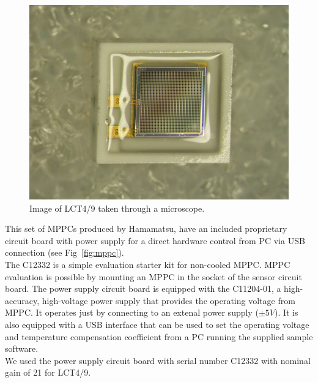 \documentclass[10pt,a4paper, openany]{book}
\begin{document}
\newpage

\begin{figure}[!h]
\begin{center}
\includegraphics[scale=0.20]{imm/lct4_1.jpg}
\end{center}
\caption{Image of LCT4/9 taken through a microscope.}
\label{fig:lct4_1}
\end{figure}

This set of MPPCs produced by Hamamatsu, have an included proprietary circuit board with power supply for a direct hardware control from PC via USB connection (see Fig~\ref{fig:mppc}).\\
The C12332 is a simple evaluation starter kit for non-cooled MPPC. MPPC evaluation is possible by mounting an MPPC in the socket of the sensor circuit board. The power supply circuit board is equipped with the C11204-01, a high-accuracy, high-voltage power supply that provides the operating voltage from MPPC. It operates just by connecting to an extenal power supply ($\pm 5V$). It is also equipped with a USB interface that can be used to set the operating voltage and temperature compensation coefficient from a PC running the supplied sample software.\\
We used the power supply circuit board with serial number C12332 with nominal gain of 21 for LCT4/9.\\
\end{document}
